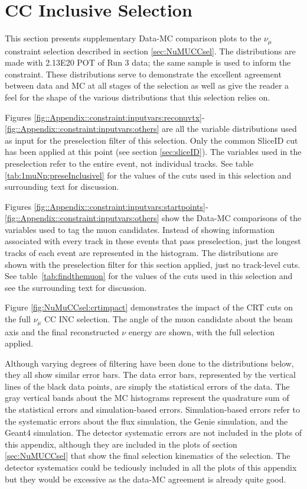 \section{\numu CC Inclusive Selection }
\label{sec:Appendix:numu:constr}
\par This section presents supplementary Data-MC comparison plots to the $\nu_{\mu}$ constraint selection described in section \ref{sec:NuMUCCsel}. The distributions are made with 2.13E20 POT of Run 3 data; the same sample is used to inform the constraint. These distributions serve to demonstrate the excellent agreement between data and MC at all stages of the selection as well as give the reader a feel for the shape of the various distributions that this selection relies on. 

\par Figures \ref{fig::Appendix::constraint:inputvars:reconuvtx}-\ref{fig::Appendix::constraint:inputvars:others} are all the variable distributions used as input for the preselection filter of this selection. Only the common SliceID cut has been applied at this point (see section \ref{sec:sliceID}). The variables used in the preselection refer to the entire event, not individual tracks. See table \ref{tab:1muNp:preseInclusivel} for the values of the cuts used in this selection and surrounding text for discussion.

\par Figures \ref{fig::Appendix::constraint:inputvars:startpoints}-\ref{fig::Appendix::constraint:inputvars:others} show the Data-MC comparisons of the variables used to tag the muon candidates. Instead of showing information associated with every track in these events that pass preselection, just the longest tracks of each event are represented in the histogram. The distributions are shown with the preselection filter for this section applied, just no track-level cuts. See table~\ref{tab:findthemuon} for the values of the cuts used in this selection and see the surrounding text for discussion.

\par Figure \ref{fig:NuMuCCsel:crtimpact} demonstrates the impact of the CRT cuts on the full $\nu_{\mu}$ CC INC selection. The angle of the muon candidate about the beam axis and the final reconstructed $\nu$ energy are shown, with the full selection applied. 

\par Although varying degrees of filtering have been done to the distributions below, they all show similar error bars. The data error bars, represented by the vertical lines of the black data points, are simply the statistical errors of the data. The gray vertical bands about the MC histograms represent the quadrature sum of the statistical errors and simulation-based errors. Simulation-based errors refer to the systematic errors about the flux simulation, the Genie simulation, and the Geant4 simulation. The detector systematic errors are not included in the plots of this appendix, although they are included in the plots of section \ref{sec:NuMUCCsel} that show the final selection kinematics of the selection. The detector systematics could be tediously included in all the plots of this appendix but they would be excessive as the data-MC agreement is already quite good. 

